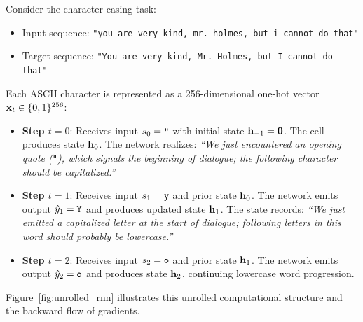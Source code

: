 \documentclass[../../main.tex]{subfiles}
\begin{document}
Consider the character casing task:
\begin{itemize}
    \item Input sequence: \texttt{"you are very kind, mr. holmes, but i cannot do that"}
    \item Target sequence: \texttt{"You are very kind, Mr. Holmes, but I cannot do that"}
\end{itemize}
Each ASCII character is represented as a 256-dimensional one-hot vector $\mathbf{x}_t \in \{0, 1\}^{256}$:
\begin{itemize}
    \item \textbf{Step $t=0$}: Receives input $s_0 = \text{\texttt{"}}$ with initial state $\mathbf{h}_{-1} = \mathbf{0}$. The cell produces state $\mathbf{h}_0$. The network realizes: \textit{``We just encountered an opening quote (\texttt{"}), which signals the beginning of dialogue; the following character should be capitalized.''}
    \item \textbf{Step $t=1$}: Receives input $s_1 = \text{\texttt{y}}$ and prior state $\mathbf{h}_0$. The network emits output $\hat{y}_1 = \text{\texttt{Y}}$ and produces updated state $\mathbf{h}_1$. The state records: \textit{``We just emitted a capitalized letter at the start of dialogue; following letters in this word should probably be lowercase.''}
    \item \textbf{Step $t=2$}: Receives input $s_2 = \text{\texttt{o}}$ and prior state $\mathbf{h}_1$. The network emits output $\hat{y}_2 = \text{\texttt{o}}$ and produces state $\mathbf{h}_2$, continuing lowercase word progression.
\end{itemize}

Figure~\ref{fig:unrolled_rnn} illustrates this unrolled computational structure and the backward flow of gradients.
\end{document}
